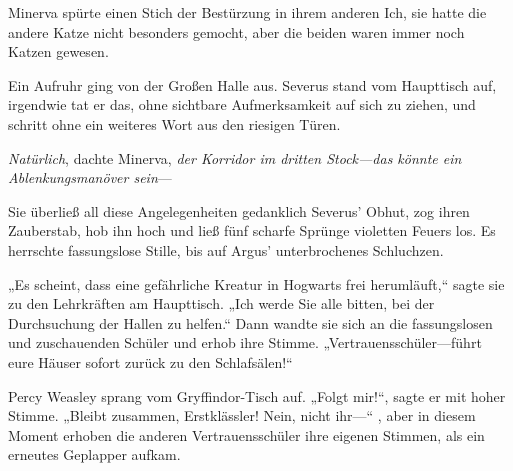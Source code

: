 Minerva spürte einen Stich der Bestürzung in ihrem anderen Ich, sie hatte die andere Katze nicht besonders gemocht, aber die beiden waren immer noch Katzen gewesen.

Ein Aufruhr ging von der Großen Halle aus. Severus stand vom Haupttisch auf, irgendwie tat er das, ohne sichtbare Aufmerksamkeit auf sich zu ziehen, und schritt ohne ein weiteres Wort aus den riesigen Türen.

\emph{Natürlich}, dachte Minerva, \emph{der Korridor im dritten Stock—das könnte ein Ablenkungsmanöver sein}—


Sie überließ all diese Angelegenheiten gedanklich Severus' Obhut, zog ihren Zauberstab, hob ihn hoch und ließ fünf scharfe Sprünge violetten Feuers los.
Es herrschte fassungslose Stille, bis auf Argus' unterbrochenes Schluchzen.

„Es scheint, dass eine gefährliche Kreatur in Hogwarts frei herumläuft,“ sagte sie zu den Lehrkräften am Haupttisch. „Ich werde Sie alle bitten, bei der Durchsuchung der Hallen zu helfen.“ Dann wandte sie sich an die fassungslosen und zuschauenden Schüler und erhob ihre Stimme. „Vertrauensschüler—führt eure Häuser sofort zurück zu den Schlafsälen!“

Percy Weasley sprang vom Gryffindor-Tisch auf. „Folgt mir!“, sagte er mit hoher Stimme. „Bleibt zusammen, Erstklässler! Nein, nicht ihr—“ , aber in diesem Moment erhoben die anderen Vertrauensschüler ihre eigenen Stimmen, als ein erneutes Geplapper aufkam.

